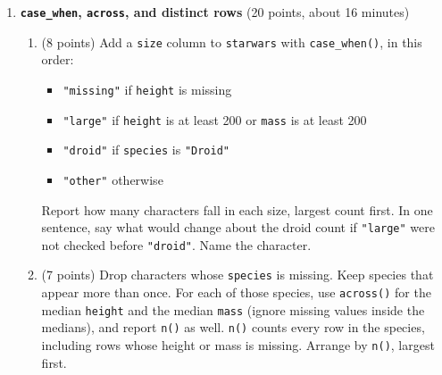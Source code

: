 \documentclass[11pt]{article}
\begin{document}
\begin{enumerate}
\begin{enumerate}[label=\alph*., leftmargin=1.7em, itemsep=0.55em]
  \item (8 points) Keep cars from \texttt{year} 2008 in class \texttt{compact} or \texttt{midsize} with \texttt{hwy} at least 30. How many cars is that? Show the five with the highest \texttt{hwy}. Break remaining ties by \texttt{cty}, highest first. Keep only \texttt{manufacturer}, \texttt{model}, \texttt{year}, \texttt{cyl}, \texttt{cty}, and \texttt{hwy}.
  \item (7 points) For each \texttt{class}, report the number of cars, the mean of \texttt{hwy}, and the median of \texttt{cty}. Arrange by mean highway mileage, highest first.
  \item (5 points) Add a column \texttt{economy} equal to \texttt{(cty + hwy) / 2}. Place it immediately after \texttt{model}. Drop \texttt{trans} and \texttt{fl}. Show the column names of the result, in order.
\end{enumerate}

\item \textbf{\texttt{case\_when}, \texttt{across}, and distinct rows} (20 points, about 16 minutes)

\begin{enumerate}[label=\alph*., leftmargin=1.7em, itemsep=0.55em]
  \item (8 points) Add a \texttt{size} column to \texttt{starwars} with \texttt{case\_when()}, in this order:
  \begin{itemize}
    \item \texttt{"missing"} if \texttt{height} is missing
    \item \texttt{"large"} if \texttt{height} is at least 200 or \texttt{mass} is at least 200
    \item \texttt{"droid"} if \texttt{species} is \texttt{"Droid"}
    \item \texttt{"other"} otherwise
  \end{itemize}
  Report how many characters fall in each size, largest count first.
  In one sentence, say what would change about the droid count if \texttt{"large"} were not checked before \texttt{"droid"}. Name the character.

  \item (7 points) Drop characters whose \texttt{species} is missing. Keep species that appear more than once. For each of those species, use \texttt{across()} for the median \texttt{height} and the median \texttt{mass} (ignore missing values inside the medians), and report \texttt{n()} as well. \texttt{n()} counts every row in the species, including rows whose height or mass is missing. Arrange by \texttt{n()}, largest first.


\end{enumerate}
\end{enumerate}
\end{document}
